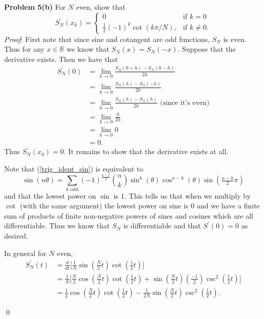\documentclass[12pt]{article}
\newcommand{\problem}[1]{\hspace{-4 ex} \large \textbf{Problem #1} }
\renewenvironment{proof}{\hspace{-4 ex} \emph{Proof}:}{\qed}
\newcommand{\RR}{\mathbb{R}}
\begin{document}
\problem{5(b)} For $N$ even, show that 
$$
S_N^\prime(x_k) = \begin{cases} 0 & \text{if } k=0 \\
							\frac{1}{2}(-1)^k\cot(k\pi / N), & \text{if } k \neq 0 \text{.} \end{cases}
$$
\begin{proof}
	First note that since sine and cotangent are odd functions, $S_N$ is even. Thus for any $x \in \RR$ we know that $S_N(x) = S_N(-x)$. Suppose that the derivative exists. Then we have that
	\begin{align*}
		S_N^\prime(0) &= \lim_{h \to 0} \frac{S_N(0+h) - S_N(0-h)}{2h} \\
			&= \lim_{h \to 0} \frac{S_N(h) - S_N(-h)}{2h} \\
			&= \lim_{h \to 0} \frac{S_N(h) - S_N(h)}{2h} \text{\ \ \ \ (since it's even)}\\
			&= \lim_{h \to 0} \frac{0}{2h} \\
			&= \lim_{h \to 0} 0 \\
			&= 0 \text{.}
	\end{align*}
	Thus $S_N^\prime(x_0) = 0$. It remains to show that the derivative exists at all.\bigbreak
	
	Note that (\ref{trig_ident_sin}) is equivalent to
	$$
	\sin(n \theta) = \sum_{k\text{ odd}} (-1)^{\frac{k-1}{2}}{n \choose k} \sin^k(\theta)\cos^{n-k}(\theta) \sin(\tfrac{n-k}{2}\pi)
	$$
	and that the lowest power on $\sin$ is $1$. This tells us that when we multiply by $\cot$ (with the same argument) the lowest power on sine is $0$ and we have a finite sum of products of finite non-negative powers of sines and cosines which are all differentiable. Thus we know that $S_N$ is differentiable and that $S^\prime(0)=0$ as desired. \bigbreak
	
	In general for $N$ even,
	\begin{align*}
		S_N^\prime(t) &= \frac{d}{dt} \bigg[\frac{1}{N} \sin \left(\frac{N}{2}t \right) \cot \left( \frac{1}{2}t \right) \bigg] \\
		&= \frac{1}{N} \bigg[ \frac{N}{2}\cos\left(\frac{N}{2}t \right)\cot \left( \frac{1}{2}t \right) + 
			\sin \left(\frac{N}{2}t \right) \left(\tfrac{-1}{2} \right) \csc^2\left( \frac{1}{2}t \right) \bigg] \\
		&= \frac{1}{2}\cos\left(\frac{N}{2}t \right)\cot \left( \frac{1}{2}t \right) - 
		\frac{1}{2N}\sin \left(\frac{N}{2}t \right)  \csc^2 \left( \frac{1}{2}t \right) \text{.}
	\end{align*}
	

\end{proof}
\end{document}
